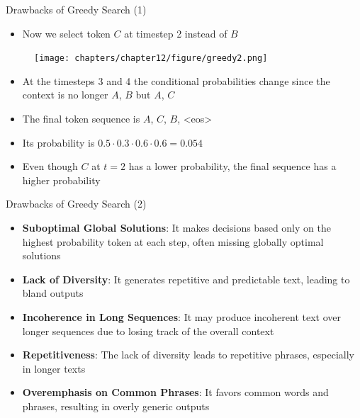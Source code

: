 \begin{vbframe}{Drawbacks of Greedy Search (1)}

\begin{itemize}
    \item Now we select token $C$ at timestep 2 instead of $B$
\end{itemize}

\begin{figure}
    \centering
    \texttt{[image: chapters/chapter12/figure/greedy2.png]}
\end{figure}

\begin{itemize}
    \item At the timesteps 3 and 4 the conditional probabilities change since the context is no longer $A$, $B$ but $A$, $C$
    \item The final token sequence is $A$, $C$, $B$, <eos>
    \item Its probability is $0.5 \cdot 0.3 \cdot 0.6 \cdot 0.6 = 0.054$
    \item Even though $C$ at $t=2$ has a lower probability, the final sequence has a higher probability
\end{itemize}
    
\end{vbframe}


\begin{vbframe}{Drawbacks of Greedy Search (2)}

\vfill

\begin{itemize}
    \item \textbf{Suboptimal Global Solutions}: It makes decisions based only on the highest probability token at each step, often missing globally optimal solutions
    \item \textbf{Lack of Diversity}: It generates repetitive and predictable text, leading to bland outputs
    \item \textbf{Incoherence in Long Sequences}: It may produce incoherent text over longer sequences due to losing track of the overall context
    \item \textbf{Repetitiveness}: The lack of diversity leads to repetitive phrases, especially in longer texts
    \item \textbf{Overemphasis on Common Phrases}: It favors common words and phrases, resulting in overly generic outputs
\end{itemize}

\vfill

\end{vbframe}

